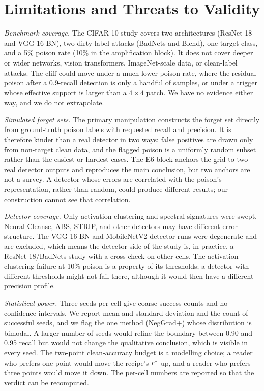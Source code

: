 \section{Limitations and Threats to Validity}
\label{sec:limits}

\emph{Benchmark coverage.} The CIFAR-10 study covers two architectures
(ResNet-18 and VGG-16-BN), two dirty-label attacks (BadNets and Blend), one
target class, and a 5\% poison rate (10\% in the amplification block). It does
not cover deeper or wider networks, vision transformers, ImageNet-scale data, or
clean-label attacks. The cliff could move under a much lower poison rate, where
the residual poison after a 0.9-recall detection is only a handful of samples, or
under a trigger whose effective support is larger than a $4\times4$ patch. We
have no evidence either way, and we do not extrapolate.

\emph{Simulated forget sets.} The primary manipulation constructs the forget set
directly from ground-truth poison labels with requested recall and precision. It
is therefore kinder than a real detector in two ways: false positives are drawn
only from non-target clean data, and the flagged poison is a uniformly random
subset rather than the easiest or hardest cases. The E6 block anchors the grid to
two real detector outputs and reproduces the main conclusion, but two anchors are
not a survey. A detector whose errors are correlated with the poison's
representation, rather than random, could produce different results; our
construction cannot see that correlation.

\emph{Detector coverage.} Only activation clustering and spectral signatures were
swept. Neural Cleanse, ABS, STRIP, and other detectors may have different error
structure. The VGG-16-BN and MobileNetV2 detector runs were degenerate and are
excluded, which means the detector side of the study is, in practice, a
ResNet-18/BadNets study with a cross-check on other cells. The activation
clustering failure at 10\% poison is a property of its thresholds; a detector
with different thresholds might not fail there, although it would then have a
different precision profile.

\emph{Statistical power.} Three seeds per cell give coarse success counts and no
confidence intervals. We report mean and standard deviation and the count of
successful seeds, and we flag the one method (NegGrad+) whose distribution is
bimodal. A larger number of seeds would refine the boundary between 0.90 and
0.95 recall but would not change the qualitative conclusion, which is visible in
every seed. The two-point clean-accuracy budget is a modelling choice; a reader
who prefers one point would move the recipe's $r^{\ast}$ up, and a reader who
prefers three points would move it down. The per-cell numbers are reported so
that the verdict can be recomputed.

